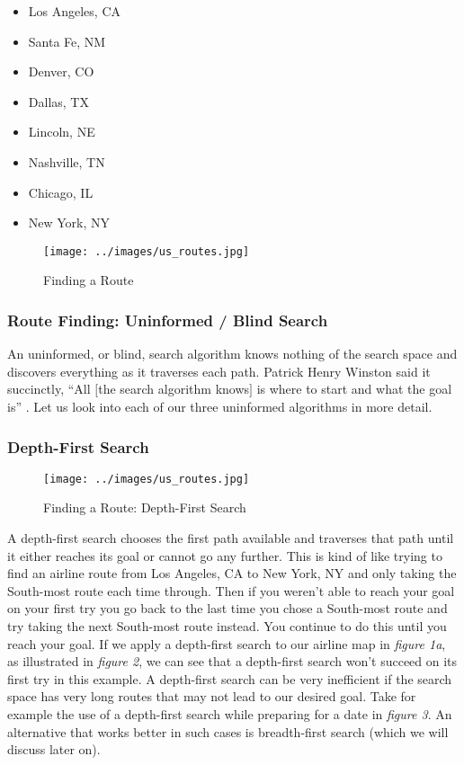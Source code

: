 \begin{itemize}\itemsep-4pt
    \item Los Angeles, CA
    \item Santa Fe, NM
    \item Denver, CO
    \item Dallas, TX
    \item Lincoln, NE
    \item Nashville, TN
    \item Chicago, IL
    \item New York, NY
\end{itemize}

\begin{figure}[h!]
    \centering
    \texttt{[image: ../images/us\_routes.jpg]}
    \caption{Finding a Route}
\end{figure}

\subsubsection{Route Finding: Uninformed / Blind Search}
An uninformed, or blind, search algorithm knows nothing of the search space and
discovers everything as it traverses each path.  Patrick Henry Winston said
it succinctly, ``All $[$the search algorithm knows$]$ is where to start and
what the goal is'' \cite{winston1992}.  Let us look into each of our three
uninformed algorithms in more detail.

\subsubsection{Depth-First Search}
\begin{figure}[h!]
    \centering
    \texttt{[image: ../images/us\_routes.jpg]}
    \caption{Finding a Route: Depth-First Search}
\end{figure}

A depth-first search chooses the first path available and traverses that path
until it either reaches its goal or cannot go any further.  This is kind of like
trying to find an airline route from Los Angeles, CA to New York, NY and only
taking the South-most route each time through.  Then if you weren't able to
reach your goal on your first try you go back to the last time you chose a
South-most route and try taking the next South-most route instead.  You
continue to do this until you reach your goal.  If we apply a depth-first search
to our airline map in \emph{figure 1a}, as illustrated in \emph{figure 2}, we 
can see that a depth-first search won't succeed on its first try in this 
example.  A depth-first search can be very inefficient if the search space has 
very long routes that may not lead to our desired goal.  Take for example the 
use of a depth-first search while preparing for a date in \emph{figure 3}.  An 
alternative that works better in such cases is breadth-first search (which we 
will discuss later on).

